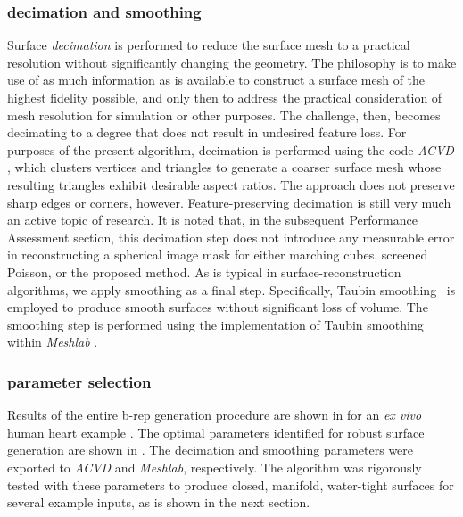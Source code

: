 \subsubsection{decimation and smoothing}

Surface \textit{decimation} is performed to reduce the surface mesh to a practical resolution without significantly changing the geometry. The philosophy is to make use of as much information as is available to construct a surface mesh of the highest fidelity possible, and only then to address the practical consideration of mesh resolution for simulation or other purposes. The challenge, then, becomes decimating to a degree that does not result in undesired feature loss.  For purposes of the present algorithm, decimation is performed using the code \textit{ACVD} \cite{valette_2004, valette_2008}, which clusters vertices and triangles to generate a coarser surface mesh whose resulting triangles exhibit desirable aspect ratios. The approach does not preserve sharp edges or corners, however.  Feature-preserving decimation is still very much an active topic of research. It is noted that, in the subsequent Performance Assessment section, this decimation step does not introduce any measurable error in reconstructing a spherical image mask for either marching cubes, screened Poisson, or the proposed method. As is typical in surface-reconstruction algorithms, we apply smoothing as a final step. Specifically, Taubin smoothing~\cite{taubin1995signal, taubin_1995} is employed to produce smooth surfaces without significant loss of volume. The smoothing step is performed using the implementation of Taubin smoothing within \textit{Meshlab} \cite{meshlab}.

\subsubsection{parameter selection}

Results of the entire b-rep generation procedure are shown in  for an \textit{ex vivo} human heart example \cite{cvgg}. The optimal parameters identified for robust surface generation are shown in . The decimation and smoothing parameters were exported to \textit{ACVD} and \textit{Meshlab}, respectively. The algorithm was rigorously tested with these parameters to produce closed, manifold, water-tight surfaces for several example inputs, as is shown in the next section.

